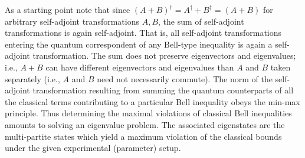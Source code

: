 \documentclass[prl,showpacs,showkeys,amsfonts,amsmath,twocolumn]{revtex4}
\begin{document}
As a starting point note that
since $(A+B)^\dagger =A^\dagger +B^\dagger = (A+B)$ for arbitrary self-adjoint transformations $A,B$,
the sum of self-adjoint transformations is again self-adjoint.
That is, all self-adjoint transformations entering the quantum correspondent of any Bell-type inequality
is again a self-adjoint transformation.
The sum does not preserve eigenvectors and eigenvalues;
i.e., $A+B$ can have different eigenvectors and eigenvalues than $A$ and $B$ taken separately
(i.e., $A$ and $B$ need not necessarily commute).
The norm of the self-adjoint transformation resulting from summing the quantum counterparts
of all the classical terms contributing to a particular Bell inequality obeys the min-max principle.
Thus determining the maximal violations of classical Bell inequalities amounts to
solving an eigenvalue problem.
The associated eigenstates are the multi-partite states which yield a maximum violation
of the classical bounds under the given experimental (parameter) setup.
\end{document}
